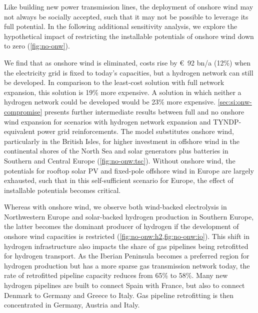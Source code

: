 Like building new power transmission lines, the deployment of onshore wind may
not always be socially accepted, such that it may not be possible to leverage
its full potential. In the following additional sensitivity analysis, we explore
the hypothetical impact of restricting the installable potentials of onshore
wind down to zero (\cref{fig:no-onw}).

We find that as onshore wind is eliminated, costs rise by \euro~92 bn/a (12\%)
when the electricity grid is fixed to today's capacities, but a hydrogen network
can still be developed. In comparison to the least-cost solution with full
network expansion, this solution is 19\% more expensive. A solution in which
neither a hydrogen network could be developed would be 23\% more expensive.
\cref{sec:si:onw-compromise} presents further intermediate results between full
and no onshore wind expansion for scenarios with hydrogen network expansion and
TYNDP-equivalent power grid reinforcements. The model substitutes onshore wind,
particularly in the British Isles, for higher investment in offshore wind in the
continental shores of the North Sea and solar generators plus batteries in
Southern and Central Europe (\cref{fig:no-onw:tsc}).  Without onshore wind, the
potentials for rooftop solar PV and fixed-pole offshore wind in Europe are
largely exhausted, such that in this self-sufficient scenario for Europe, the
effect of installable potentials becomes critical.


Whereas with onshore wind, we observe both wind-backed electrolysis in
Northwestern Europe and solar-backed hydrogen production in Southern Europe, the
latter becomes the dominant producer of hydrogen if the development of onshore
wind capacities is restricted (\cref{fig:no-onw:h2,fig:no-onw:io}). This shift
in hydrogen infrastructure also impacts the share of gas pipelines being
retrofitted for hydrogen transport. As the Iberian Peninsula becomes a preferred
region for hydrogen production but has a more sparse gas transmission network
today, the rate of retrofitted pipeline capacity reduces from 65\% to 58\%. Many
new hydrogen pipelines are built to connect Spain with France, but also to
connect Denmark to Germany and Greece to Italy. Gas pipeline retrofitting is
then concentrated in Germany, Austria and Italy.

